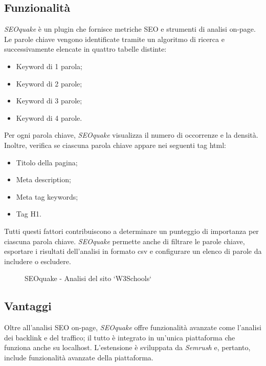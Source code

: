 \subsection{Funzionalità}
\par \textit{SEOquake} è un plugin che fornisce metriche SEO e strumenti di analisi \gls{on-page}. Le parole chiave vengono identificate tramite un algoritmo di ricerca e successivamente elencate in quattro tabelle distinte:
\begin{itemize}
    \item Keyword di 1 parola;
    \item Keyword di 2 parole;
    \item Keyword di 3 parole;
    \item Keyword di 4 parole.
\end{itemize}
\par\noindent Per ogni parola chiave, \textit{SEOquake} visualizza il numero di occorrenze e la densità. Inoltre, verifica se ciascuna parola chiave appare nei seguenti tag \gls{html}:
\begin{itemize}
    \item Titolo della pagina;
    \item Meta description;
    \item Meta tag keywords;
    \item Tag H1.
\end{itemize}
\par\noindent Tutti questi fattori contribuiscono a determinare un punteggio di importanza per ciascuna parola chiave. \textit{SEOquake} permette anche di filtrare le parole chiave, esportare i risultati dell'analisi in formato \gls{csv} e configurare un elenco di parole da includere o escludere.

\begin{figure}[H]
    \centering 
    \caption{SEOquake - Analisi del sito `W3Schools`}
\end{figure}

\subsection{Vantaggi}
\par Oltre all'analisi SEO \gls{on-page}, \textit{SEOquake} offre funzionalità avanzate come l'analisi dei \gls{backlink} e del traffico; il tutto è integrato in un'unica piattaforma che funziona anche su \gls{localhost}. L'estensione è sviluppata da \textit{Semrush} e, pertanto, include funzionalità avanzate della piattaforma.

